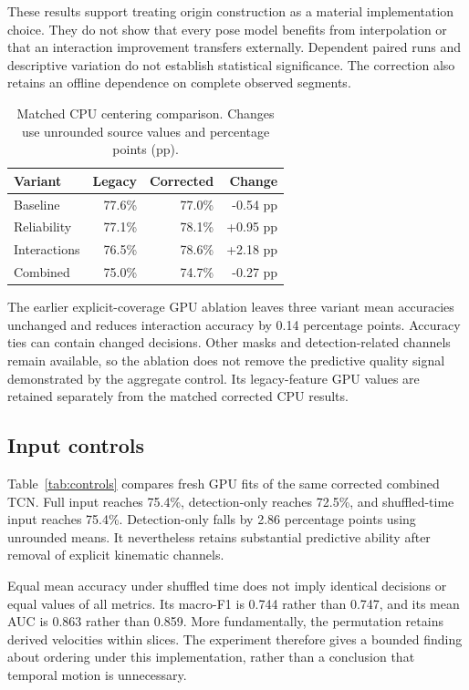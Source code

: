 \documentclass[journal]{IEEEtai}
\begin{document}
These results support treating origin construction as a material implementation choice. They do not show that every pose model benefits from interpolation or that an interaction improvement transfers externally. Dependent paired runs and descriptive variation do not establish statistical significance. The correction also retains an offline dependence on complete observed segments.


\begin{table}[t]
\caption{Matched CPU centering comparison. Changes use unrounded source values and percentage points (pp).}
\label{tab:center}\centering
\begin{tabular}{lrrr}
\toprule
Variant & Legacy & Corrected & Change\\
\midrule
Baseline & 77.6\% & 77.0\% & -0.54 pp\\
Reliability & 77.1\% & 78.1\% & +0.95 pp\\
Interactions & 76.5\% & 78.6\% & +2.18 pp\\
Combined & 75.0\% & 74.7\% & -0.27 pp\\
\bottomrule
\end{tabular}
\end{table}


The earlier explicit-coverage GPU ablation leaves three variant mean accuracies unchanged and reduces interaction accuracy by 0.14 percentage points. Accuracy ties can contain changed decisions. Other masks and detection-related channels remain available, so the ablation does not remove the predictive quality signal demonstrated by the aggregate control. Its legacy-feature GPU values are retained separately from the matched corrected CPU results.

\subsection{Input controls}
Table~\ref{tab:controls} compares fresh GPU fits of the same corrected combined TCN. Full input reaches 75.4\%, detection-only reaches 72.5\%, and shuffled-time input reaches 75.4\%. Detection-only falls by 2.86 percentage points using unrounded means. It nevertheless retains substantial predictive ability after removal of explicit kinematic channels.

Equal mean accuracy under shuffled time does not imply identical decisions or equal values of all metrics. Its macro-F1 is 0.744 rather than 0.747, and its mean AUC is 0.863 rather than 0.859. More fundamentally, the permutation retains derived velocities within slices. The experiment therefore gives a bounded finding about ordering under this implementation, rather than a conclusion that temporal motion is unnecessary.
\end{document}
